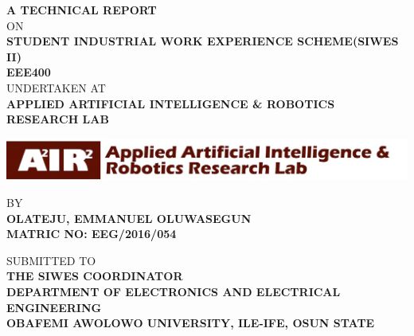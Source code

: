 \begin{titlepage}

\begin{center}

\large{ {\bf A TECHNICAL REPORT} \\ ON}\\
\large{ {\bf STUDENT INDUSTRIAL WORK EXPERIENCE SCHEME(SIWES II) \\ EEE400}}\\
\large{UNDERTAKEN AT}\\

\large{{\bf APPLIED ARTIFICIAL INTELLIGENCE \& ROBOTICS RESEARCH LAB}}\\
\vspace{.3in}

\includegraphics{air-logo}\\
\vspace{.3in}

\large{BY}\\
\large{{\bf OLATEJU, EMMANUEL OLUWASEGUN \\ MATRIC NO: EEG/2016/054}}\\
\vspace{.3in}

\large{SUBMITTED TO \\ {\bf THE SIWES COORDINATOR \\ DEPARTMENT OF ELECTRONICS AND ELECTRICAL ENGINEERING}}\\
\large{{\bf OBAFEMI AWOLOWO UNIVERSITY, ILE-IFE, OSUN STATE}}\\
\vspace{.3in}



\end{center}

\end{titlepage}